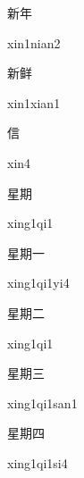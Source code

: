 \begin{verbete}{新年}
\begin{pronuncia}{xin1nian2}
\end{pronuncia}
\end{verbete}

\begin{verbete}{新鲜}
\begin{pronuncia}{xin1xian1}
\end{pronuncia}
\end{verbete}

\begin{verbete}[xin4]{信}
\begin{pronuncia}{xin4}
\end{pronuncia}
\end{verbete}

\begin{verbete}[xing1qi1]{星期}
\begin{pronuncia}{xing1qi1}
\end{pronuncia}
\end{verbete}

\begin{verbete}[xing1qi1yi4]{星期一}
\begin{pronuncia}{xing1qi1yi4}
\end{pronuncia}
\end{verbete}

\begin{verbete}[xing1qi1]{星期二}
\begin{pronuncia}{xing1qi1}
\end{pronuncia}
\end{verbete}

\begin{verbete}{星期三}
\begin{pronuncia}{xing1qi1san1}
\end{pronuncia}
\end{verbete}

\begin{verbete}[xing1qi1si4]{星期四}
\begin{pronuncia}{xing1qi1si4}
\end{pronuncia}
\end{verbete}

